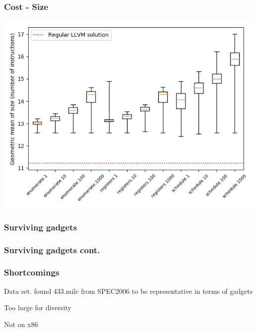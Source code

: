 \begin{frame}
	\frametitle{Cost - Size}

	\includegraphics[width=\textwidth]{../results/figures/cost_size}

\end{frame}


\begin{frame}
	\frametitle{Surviving gadgets}


\end{frame}

\begin{frame}
	\frametitle{Surviving gadgets cont.}


\end{frame}

\begin{frame}
	\frametitle{Shortcomings}

	Data set. \textcite{large-scale-automated} found 433.milc from SPEC2006 to be representative
	in terms of gadgets

	\vspace{0.5cm}

	Too large for diversity

	\vspace{0.5cm}

	Not on x86

\end{frame}
